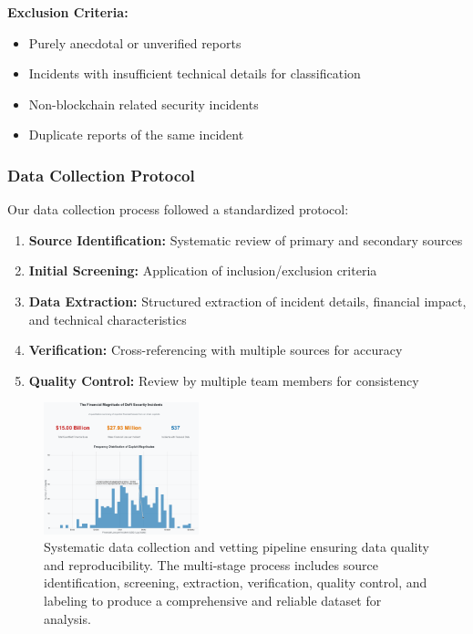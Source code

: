 \textbf{Exclusion Criteria:}
\begin{itemize}
    \item Purely anecdotal or unverified reports
    \item Incidents with insufficient technical details for classification
    \item Non-blockchain related security incidents
    \item Duplicate reports of the same incident
\end{itemize}

\subsubsection{Data Collection Protocol}
Our data collection process followed a standardized protocol:
\begin{enumerate}
    \item \textbf{Source Identification:} Systematic review of primary and secondary sources
    \item \textbf{Initial Screening:} Application of inclusion/exclusion criteria
    \item \textbf{Data Extraction:} Structured extraction of incident details, financial impact, and technical characteristics
    \item \textbf{Verification:} Cross-referencing with multiple sources for accuracy
    \item \textbf{Quality Control:} Review by multiple team members for consistency
\end{enumerate}


\begin{figure}[H]
\centering
\includegraphics[width=0.4\textwidth]{../figure/methodology/fig4.png}
\caption{Systematic data collection and vetting pipeline ensuring data quality and reproducibility. The multi-stage process includes source identification, screening, extraction, verification, quality control, and labeling to produce a comprehensive and reliable dataset for analysis.}
\label{fig:data_pipeline}
\end{figure}
